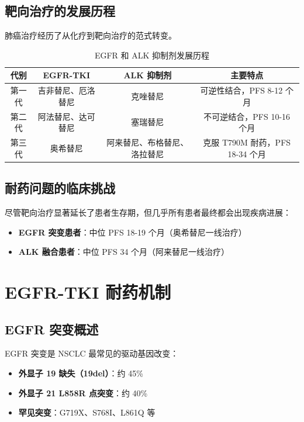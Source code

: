 \documentclass[12pt,a4paper]{article}
\begin{document}
\subsection{靶向治疗的发展历程}

肺癌治疗经历了从化疗到靶向治疗的范式转变。

\begin{table}[H]
\centering
\caption{EGFR 和 ALK 抑制剂发展历程}
\label{tab:tki-evolution}
\begin{tabular}{cccc}
\toprule
\textbf{代别} & \textbf{EGFR-TKI} & \textbf{ALK 抑制剂} & \textbf{主要特点} \\
\midrule
第一代 & 吉非替尼、厄洛替尼 & 克唑替尼 & 可逆性结合，PFS 8-12 个月 \\
第二代 & 阿法替尼、达可替尼 & 塞瑞替尼 & 不可逆结合，PFS 10-16 个月 \\
第三代 & 奥希替尼 & 阿来替尼、布格替尼、洛拉替尼 & 克服 T790M 耐药，PFS 18-34 个月 \\
\bottomrule
\end{tabular}
\end{table}

\subsection{耐药问题的临床挑战}

尽管靶向治疗显著延长了患者生存期，但几乎所有患者最终都会出现疾病进展：
\begin{itemize}
    \item \textbf{EGFR 突变患者}：中位 PFS 18-19 个月（奥希替尼一线治疗）
    \item \textbf{ALK 融合患者}：中位 PFS 34 个月（阿来替尼一线治疗）
\end{itemize}

\section{EGFR-TKI 耐药机制}

\subsection{EGFR 突变概述}

EGFR 突变是 NSCLC 最常见的驱动基因改变：
\begin{itemize}
    \item \textbf{外显子 19 缺失（19del）}：约 45\%
    \item \textbf{外显子 21 L858R 点突变}：约 40\%
    \item \textbf{罕见突变}：G719X、S768I、L861Q 等
\end{itemize}
\end{document}
